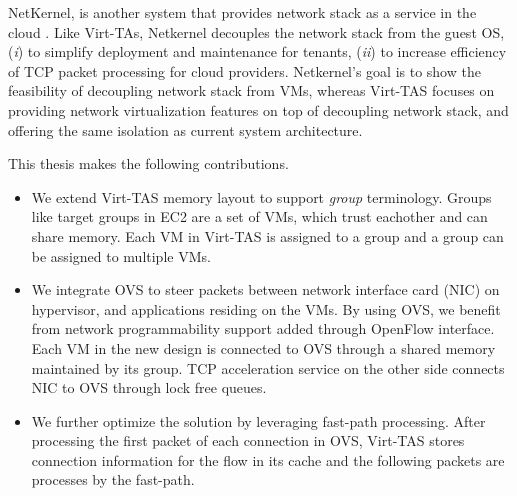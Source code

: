 NetKernel, is another system that provides network stack as a service in the cloud
\cite{niu2021netkernel, niu2017network}.
Like Virt-TAs, Netkernel decouples the network stack from the guest OS, 
(\emph{i}) to simplify deployment and maintenance for tenants, (\emph{ii}) to increase  
efficiency of TCP packet processing for cloud providers. Netkernel's 
goal is to show the feasibility of decoupling network stack from VMs, whereas Virt-TAS
focuses on providing network virtualization features on top of decoupling network stack, and 
offering the same isolation as current system architecture.

This thesis makes the following contributions.
\begin{itemize}
    \item We extend Virt-TAS memory layout to support \emph{group} terminology. Groups 
    like target groups in EC2 are a set of VMs, which trust eachother and can share memory. 
    Each VM in Virt-TAS is assigned to a group and a group can be assigned to multiple 
    VMs.

    \item We integrate OVS to steer packets between network interface card (NIC) on hypervisor, 
    and applications residing on the VMs. By using OVS, we benefit from network programmability
    support added through OpenFlow interface. Each VM in the new design is connected to OVS 
    through a shared memory maintained by its group. TCP acceleration service on the other 
    side connects NIC to OVS through lock free queues.

    \item We further optimize the solution by leveraging fast-path processing. After processing
    the first packet of each connection in OVS, Virt-TAS stores connection information 
    for the flow in its cache and the following packets are processes by the fast-path.

\end{itemize}





